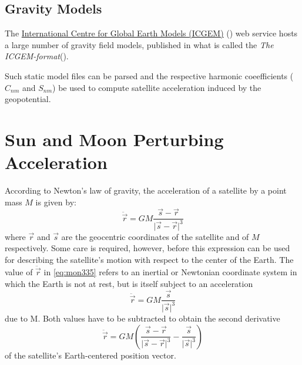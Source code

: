 
\subsection{Gravity Models}
The \href{http://icgem.gfz-potsdam.de/home}{International Centre for Global Earth Models (ICGEM)}  
(\cite{icgempub}) web service hosts a large number of gravity field models, 
published in what is called the \emph{The ICGEM-format}(\cite{ICGEMFormat}). 

Such static model files can be parsed and the respective harmonic coeefficients 
(\(C_{nm}\) and \(S_{nm}\)) be used to compute satellite acceleration induced by 
the geopotential.

\section{Sun and Moon Perturbing Acceleration}
According to Newton's law of gravity, the acceleration of a satellite by a point 
mass \(M\) is given by:
\begin{equation}
    \label{eq:mon335}
    \ddot{\vec{r}} = G M \frac{\vec{s}-\vec{r}}{\lvert \vec{s} - \vec{r} \rvert ^3}
\end{equation}
where \(\vec{r}\) and \(\vec{s}\) are the geocentric coordinates of the satellite 
and of \(M\) respectively. Some care is required, however, before this expression 
can be used for describing the satellite's motion with respect to the center of 
the Earth. The value of \(\ddot{\vec{r}}\) in \ref{eq:mon335} refers to an 
inertial or Newtonian coordinate system in which the Earth is not at rest, but 
is itself subject to an acceleration
\begin{equation}
    \ddot{\vec{r}} = G M \frac{\vec{s}}{\lvert \vec{s} \rvert ^3}
\end{equation}
due to M. Both values have to be subtracted to obtain the second derivative
\begin{equation}
    \label{eq:mon337}
    \ddot{\vec{r}} = G M (\frac{\vec{s}-\vec{r}}{\lvert \vec{s} - \vec{r} \rvert ^3} - \frac{\vec{s}}{\lvert \vec{s} \rvert ^3})
\end{equation}
of the satellite's Earth-centered position vector.

